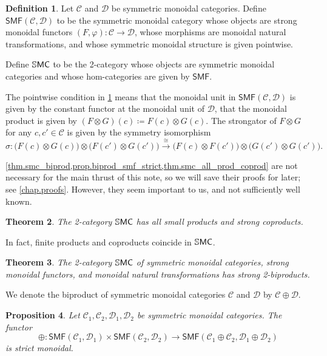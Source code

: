 \documentclass[11pt, oneside, article]{memoir}
\theoremstyle{plain}
\newtheorem{theorem}{Theorem}[chapter]
\newtheorem{proposition}[theorem]{Proposition}
\theoremstyle{definition}
\newtheorem{definition}[theorem]{Definition}
\theoremstyle{remark}
\newcommand{\cat}[1]{\mathcal{#1}}%
\newcommand{\Cat}[1]{{\mathsf{#1}}}%
\newcommand{\CCat}[1]{\mathbb{\StrLeft{#1}{1}}\Cat{\StrGobbleLeft{#1}{1}}}%
\newcommand{\smf}{\Cat{SMF}}
\newcommand{\ssmc}{\CCat{SMC}}
\newcommand{\To}[1]{\xrightarrow{#1}}
\begin{document}
\begin{definition}\label{def.smf}
Let $\cat{C}$ and $\cat{D}$ be symmetric monoidal categories. Define $\smf(\cat{C},\cat{D})$ to be the symmetric monoidal category whose objects are strong monoidal functors $(F,\varphi)\colon\cat{C}\to\cat{D}$, whose morphisms are monoidal natural transformations, and whose symmetric monoidal structure is given pointwise.

Define $\ssmc$ to be the 2-category whose objects are symmetric monoidal categories and whose hom-categories are given by $\smf$.
\end{definition}

The pointwise condition in \cref{def.smf} means that the monoidal unit in $\smf(\cat{C},\cat{D})$ is given by the constant functor at the monoidal unit of $\cat{D}$, that the monoidal product is given by $(F\otimes G)(c)\coloneqq F(c)\otimes G(c).$ The strongator of $F\otimes G$ for any $c,c'\in\cat{C}$ is given by the symmetry isomorphism
\[
	\sigma\colon
	\big(F(c)\otimes G(c)\big)\otimes\big(F(c')\otimes G(c')\big)
	\To{\cong}
	\big(F(c)\otimes F(c')\big)\otimes\big(G(c')\otimes G(c')\big).
\]

\cref{thm.smc_biprod,prop.biprod_smf_strict,thm.smc_all_prod_coprod} are not necessary for the main thrust of this note, so we will save their proofs for later; see \cref{chap.proofs}. %
However, they seem important to us, and not sufficiently well known. 

\begin{theorem}\label{thm.smc_all_prod_coprod}
The 2-category $\ssmc$ has all small products and strong coproducts.
\end{theorem}

In fact, finite products and coproducts coincide in $\ssmc$.

\begin{theorem}\label{thm.smc_biprod}
The 2-category $\ssmc$ of symmetric monoidal categories, strong monoidal functors, and monoidal natural transformations has strong 2-biproducts.
\end{theorem}

We denote the biproduct of symmetric monoidal categories $\cat{C}$ and $\cat{D}$ by $\cat{C}\oplus\cat{D}$.

\begin{proposition}\label{prop.biprod_smf_strict}
Let $\cat{C}_1,\cat{C}_2,\cat{D}_1,\cat{D}_2$ be symmetric monoidal categories. The functor
\[
  \oplus\colon
  \smf(\cat{C}_1,\cat{D}_1)\times\smf(\cat{C}_2,\cat{D}_2)
  \to
  \smf(\cat{C}_1\oplus\cat{C}_2,\cat{D}_1\oplus\cat{D}_2)
\]
is strict monoidal.
\end{proposition}
\end{document}
